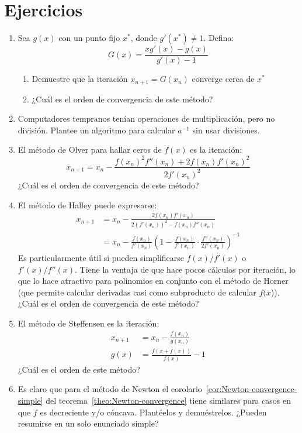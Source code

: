\section*{Ejercicios}
\label{sec:exercises-02}

  \begin{enumerate}
  \item
    Sea \(g(x)\) con un punto fijo \(x^*\),
    donde \(g'(x^*) \ne 1\).
    Defina:
    \begin{equation*}
      G(x)
        = \frac{x g'(x) - g(x)}{g'(x) - 1}
    \end{equation*}
    \begin{enumerate}
    \item
      Demuestre que la iteración \(x_{n + 1} = G(x_n)\)
      converge cerca de \(x^*\)
    \item
      ¿Cuál es el orden de convergencia de este método?
    \end{enumerate}
  \item
    Computadores tempranos tenían operaciones de multiplicación,
    pero no división.
    Plantee un algoritmo para calcular \(a^{-1}\)
    sin usar divisiones.
  \item
    El método de Olver para hallar ceros de \(f(x)\) es la iteración:
    \begin{equation*}
      x_{n + 1}
        = x_n - \frac{f(x_n)^2 f''(x_n) + 2 f(x_n) f'(x_n)^2}{2 f'(x_n)^2}
    \end{equation*}
    ¿Cuál es el orden de convergencia de este método?
  \item
    El método de Halley puede expresarse:
    \begin{align*}
      x_{n + 1}
        &= x_n
            - \frac{2 f(x_n) f'(x_n)}
                   {2 (f'(x_n))^2 - f(x_n) f''(x_n)} \\
        &= x_n - \frac{f(x_n)}{f'(x_n)}
                   \left(
                     1 - \frac{f(x_n)}{f'(x_n)}
                           \cdot \frac{f''(x_n)}{2 f'(x_n)}
                   \right)^{-1}
    \end{align*}
    Es particularmente útil si pueden simplificarse \(f(x) / f'(x)\)
    o \(f'(x) / f''(x)\).
    Tiene la ventaja de que hace pocos cálculos por iteración,
    lo que lo hace atractivo para polinomios
    en conjunto con el método de Horner
    (que permite calcular derivadas
     casi como subproducto de calcular \(f(x\))).
    ¿Cuál es el orden de convergencia de este método?
  \item
    El método de Steffensen es la iteración:
    \begin{align*}
      x_{n + 1}
        &= x_n - \frac{f(x_n)}{g(x_n)} \\
      g(x)
        &= \frac{f(x + f(x))}{f(x)} - 1
    \end{align*}
    ¿Cuál es el orden de este método?
  \item
    Es claro que para el método de Newton
    el corolario~\ref{cor:Newton-convergence-simple}
    del teorema~\ref{theo:Newton-convergence}
    tiene similares para casos en que \(f\) es decreciente y/o cóncava.
    Plantéelos y demuéstrelos.
    ¿Pueden resumirse en un solo enunciado simple?
  \end{enumerate}


